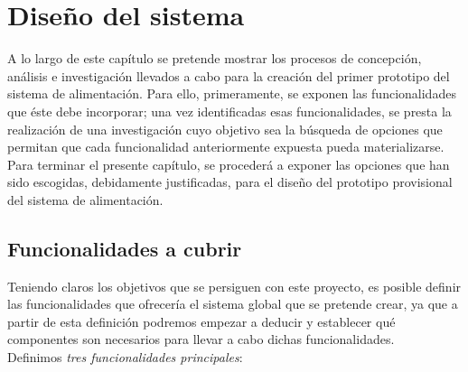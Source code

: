 \documentclass[12pt]{article}
\begin{document}
	\pagebreak
	
	\section[Diseño del sistema]{Diseño del sistema}
	\label{Sección 3: Diseño del sistema}
	\noindent A lo largo de este capítulo se pretende mostrar los procesos de concepción, análisis e investigación llevados a cabo para la creación del primer prototipo del sistema de alimentación. Para ello, primeramente, se exponen las funcionalidades que éste debe incorporar; una vez identificadas esas funcionalidades, se presta la realización de una investigación cuyo objetivo sea la búsqueda de opciones que permitan que cada funcionalidad anteriormente expuesta pueda materializarse. Para terminar el presente capítulo, se procederá a exponer las opciones que han sido escogidas, debidamente justificadas, para el diseño del prototipo provisional del sistema de alimentación. 
	
	\subsection[Funcionalidades a cubrir]{Funcionalidades a cubrir}
	\label{subsection: funcionalidades a cubrir}
	
	\noindent Teniendo claros los objetivos que se persiguen con este proyecto, es posible definir las funcionalidades que ofrecería el sistema global que se pretende crear, ya que a partir de esta definición podremos empezar a deducir y establecer qué componentes son necesarios para llevar a cabo dichas funcionalidades. \\
	
	\noindent Definimos \textit{tres funcionalidades principales}: 
	
\end{document}
